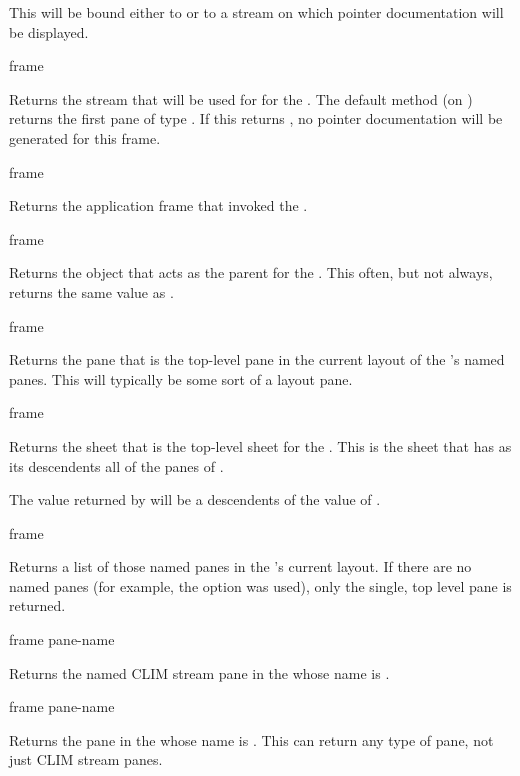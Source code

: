 This will be bound either to  or to a stream on which pointer
documentation will be displayed.

 {frame}

Returns the stream that will be used for 
for the  .  The default method (on
) returns the first pane of type
.  If this returns , no pointer
documentation will be generated for this frame.


 {frame}

Returns the application frame that invoked the  .

 {frame}

Returns the object that acts as the parent for the  .
This often, but not always, returns the same value as .


 {frame}

Returns the pane that is the top-level pane in the current layout of the
 's named panes.  This will typically be some sort of a
layout pane.

 {frame}

Returns the sheet that is the top-level sheet for the  .
This is the sheet that has as its descendents all of the panes of .

The value returned by  will be a descendents of the value of
.

 {frame}

Returns a list of those named panes in the  's current
layout.  If there are no named panes (for example, the  option was used),
only the single, top level pane is returned.
\ReadOnly

 {frame pane-name}

Returns the named CLIM stream pane in the   whose name is
.

 {frame pane-name}

Returns the pane in the   whose name is .
This can return any type of pane, not just CLIM stream panes.


